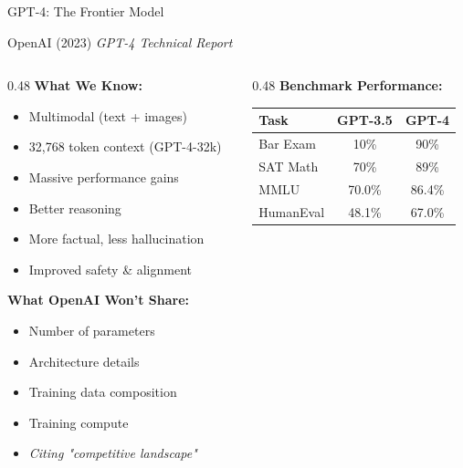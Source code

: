 \documentclass[aspectratio=169]{beamer}
\begin{document}
\begin{frame}{GPT-4: The Frontier Model 🔮}
\begin{block}{OpenAI (2023)}
\textit{GPT-4 Technical Report}
\end{block}

\vspace{0.5em}

\begin{columns}[T]
\begin{column}{0.48\textwidth}
\textbf{What We Know:}
\begin{itemize}
    \item \alert{Multimodal} (text + images)
    \item 32,768 token context (GPT-4-32k)
    \item Massive performance gains
    \item Better reasoning
    \item More factual, less hallucination
    \item Improved safety \& alignment
\end{itemize}

\vspace{0.5em}

\textbf{What OpenAI Won't Share:}
\begin{itemize}
    \item Number of parameters
    \item Architecture details
    \item Training data composition
    \item Training compute
    \item \textit{Citing "competitive landscape"}
\end{itemize}
\end{column}

\begin{column}{0.48\textwidth}
\textbf{Benchmark Performance:}
\begin{center}
\small
\begin{tabular}{lcc}
\toprule
\textbf{Task} & \textbf{GPT-3.5} & \textbf{GPT-4} \\
\midrule
Bar Exam & 10\% & 90\% \\
SAT Math & 70\% & 89\% \\
MMLU & 70.0\% & 86.4\% \\
HumanEval & 48.1\% & 67.0\% \\
\bottomrule
\end{tabular}
\end{center}


\end{column}
\end{columns}
\end{frame}
\end{document}
